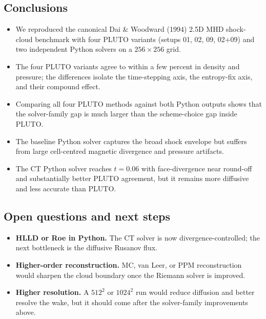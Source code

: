 \documentclass[11pt,a4paper]{article}
\begin{document}
\subsection{Conclusions}

\begin{itemize}
  \item We reproduced the canonical Dai \& Woodward (1994) 2.5D MHD shock-cloud benchmark with four PLUTO variants (setups 01, 02, 09, 02+09) and two independent Python solvers on a $256\times256$ grid.
  \item The four PLUTO variants agree to within a few percent in density and pressure; the differences isolate the time-stepping axis, the entropy-fix axis, and their compound effect.
  \item Comparing all four PLUTO methods against both Python outputs shows that the solver-family gap is much larger than the scheme-choice gap inside PLUTO.
  \item The baseline Python solver captures the broad shock envelope but suffers from large cell-centred magnetic divergence and pressure artifacts.
  \item The CT Python solver reaches $t=0.06$ with face-divergence near round-off and substantially better PLUTO agreement, but it remains more diffusive and less accurate than PLUTO.
\end{itemize}

\subsection*{Open questions and next steps}

\begin{itemize}
  \item \textbf{HLLD or Roe in Python.} The CT solver is now divergence-controlled; the next bottleneck is the diffusive Rusanov flux.
  \item \textbf{Higher-order reconstruction.} MC, van Leer, or PPM reconstruction would sharpen the cloud boundary once the Riemann solver is improved.
  \item \textbf{Higher resolution.} A $512^{2}$ or $1024^{2}$ run would reduce diffusion and better resolve the wake, but it should come after the solver-family improvements above.
\end{itemize}
\end{document}
